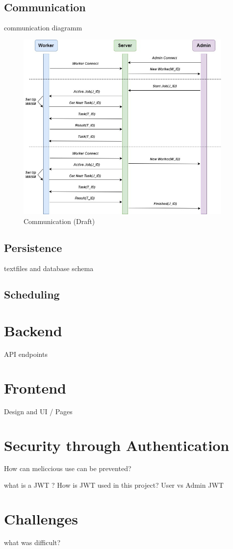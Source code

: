 \subsection{Communication}
\label{subsec:implementation:architecture:communication}
communication diagramm
\begin{figure}[htbp]
    \centering
    \includegraphics[width=0.95\textwidth]{gfx/figures/Communication.jpg}
    \caption{Communication (Draft)}
    \label{fig:implementation:architecture}
\end{figure}
\subsection{Persistence}
\label{subsec:implementation:architecture:persistence}
textfiles and database schema
\subsection{Scheduling}
\label{subsec:implementation:architecture:scheduling}


\section{Backend}
\label{sec:implementation:backend}
API endpoints 

\section{Frontend}
\label{sec:implementation:frontend}
Design and UI / Pages

\section{Security through Authentication}
\label{sec:implementation:authentication}
How can meliccious use can be prevented?

what is a JWT ? How is JWT used in this project? User vs Admin JWT

\section{Challenges}
\label{sec:implementation:challenges}
what was difficult?